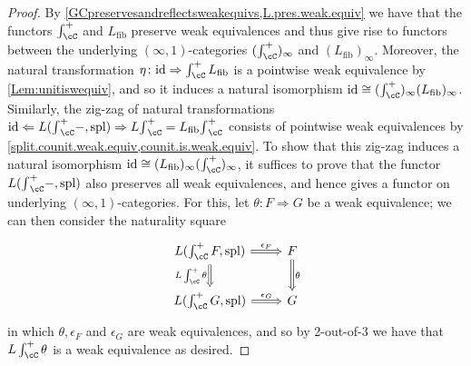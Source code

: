 \documentclass[11pt, dvipsnames]{amsart}
\begin{document}
\begin{proof}
    By \cref{GCpreservesandreflectsweakequivs,L.pres.weak.equiv} we have that the functors $\int_\cC^+$ and $L_\textrm{fib}$ preserve weak equivalences and thus give rise to functors between the underlying $(\infty,1)$-categories $(\int_\cC^+)_\infty$ and $(L_\textrm{fib})_\infty$.  Moreover, the natural transformation $\eta\colon \id\Rightarrow \int_\cC^+ L_\textrm{fib}$ is a pointwise weak equivalence  by \cref{Lem:unitiswequiv}, and so it induces a natural isomorphism $\id\cong (\int_\cC^+)_\infty (L_\textrm{fib})_\infty$. Similarly, the zig-zag of natural transformations $\id \Leftarrow L({\textstyle \int}_\cC^+ -,\mathrm{spl})\Rightarrow L{\textstyle \int}_\cC^+=L_\textrm{fib}{\textstyle \int}_\cC^+$ consists of pointwise weak equivalences by \cref{split.counit.weak.equiv,counit.is.weak.equiv}. %
    To show that this zig-zag induces a natural isomorphism $\id\cong (L_\textrm{fib})_\infty (\int_\cC^+)_\infty$, it suffices to prove that the functor $L({\textstyle \int}_\cC^+ -,\mathrm{spl})$ also preserves all weak equivalences, and hence gives a functor on underlying $(\infty,1)$-categories. For this, let $\theta\colon F\Rightarrow G$ be a weak equivalence; we can then consider the naturality square
     \[\begin{tikzcd}
        L(\int_\cC^+ F,\mathrm{spl})\rar["{\epsilon_F}", Rightarrow] \dar["{L\int_\cC^+\theta}"', Rightarrow] & F\dar["\theta", Rightarrow]\\
        L(\int_\cC^+ G,\mathrm{spl})\rar["{\epsilon_G}", Rightarrow] & G
    \end{tikzcd}\] in which $\theta,\epsilon_F$ and $\epsilon_G$ are weak equivalences, and so by 2-out-of-3 we have that $L\int_\cC^+\theta$ is a weak equivalence as desired.
\end{proof}

        
\printbibliography
\end{document}
